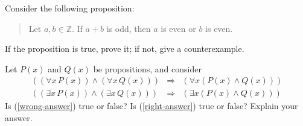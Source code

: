 \documentclass[12pt]{midterm}
\begin{document}
\begin{exam}
\begin{problem}[360]
  Consider the following proposition:
  \begin{quote}
    Let $a,b \in \mathbb{Z}$.  If $a+b$ is odd, then $a$ is even or $b$ is even.
  \end{quote}
  If the proposition is true, prove it; if not, give a counterexample.
\end{problem}

\begin{solution}\begin{solutiontext}
\end{solutiontext}\end{solution}



\begin{problem}[360]
  Let $P(x)$ and $Q(x)$ be propositions, and consider
  \begin{eqnarray}
    \left( \left( \forall x \, P(x) \right) \wedge  \left( \forall x \, Q(x) \right)  \right) & \Rightarrow & \left(\forall x \left( P(x) \wedge Q(x) \right) \right) \label{wrong-answer} \\
    \left( \left( \exists x \, P(x) \right) \wedge  \left( \exists x \, Q(x) \right)  \right) & \Rightarrow & \left(\exists x \left( P(x) \wedge Q(x) \right) \right) \label{right-answer}
  \end{eqnarray}
  Is (\ref{wrong-answer}) true or false?  Is (\ref{right-answer}) true or false?  Explain your answer.
\end{problem}

\begin{solution}\begin{solutiontext}
\end{solutiontext}\end{solution}


\end{exam}
\end{document}

